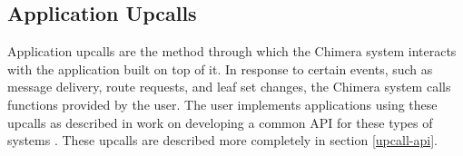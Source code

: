 \subsection{Application Upcalls}

Application upcalls are the method through which the Chimera system
interacts with the application built on top of it. In response to
certain events, such as message delivery, route requests, and leaf set
changes, the Chimera system calls functions provided by the user. The
user implements applications using these upcalls as described in work
on developing a common API for these types of systems \cite{commonapi}.
These upcalls are described more completely in section \ref{upcall-api}.

